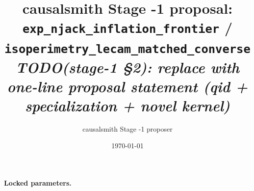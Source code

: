 \documentclass[11pt]{article}
\title{causalsmith Stage -1 proposal: \texttt{exp\_njack\_inflation\_frontier} / \texttt{isoperimetry\_lecam\_matched\_converse}%
  \\ \large\textit{TODO(stage-1 \S2): replace with one-line proposal statement (qid + specialization + novel kernel)}}
\author{causalsmith Stage -1 proposer}
\date{\today}
\theoremstyle{definition}
\theoremstyle{plain}
\theoremstyle{remark}
\begin{document}
\maketitle


\paragraph{Locked parameters.}

\begin{abstract}
\end{abstract}
\end{document}
